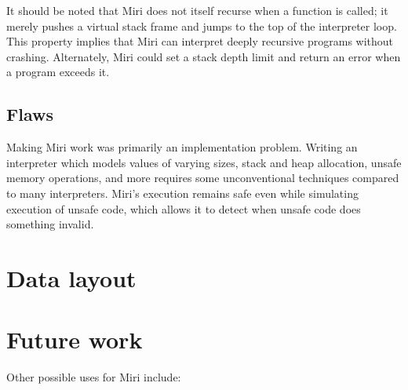 \documentclass[twocolumn]{article}
\begin{document}
It should be noted that Miri does not itself recurse when a function is called; it merely pushes a
virtual stack frame and jumps to the top of the interpreter loop. This property implies that Miri
can interpret deeply recursive programs without crashing. Alternately, Miri could set a stack
depth limit and return an error when a program exceeds it.

\subsection{Flaws}


Making Miri work was primarily an implementation problem. Writing an interpreter which models values
of varying sizes, stack and heap allocation, unsafe memory operations, and more requires some
unconventional techniques compared to many interpreters. Miri's execution remains safe even while
simulating execution of unsafe code, which allows it to detect when unsafe code does something
invalid.

\blindtext

\section{Data layout}

\blindtext

\section{Future work}

Other possible uses for Miri include:
\end{document}
